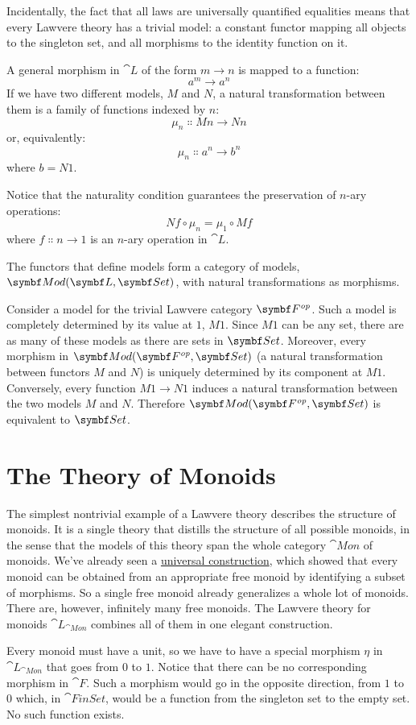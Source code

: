 Incidentally, the fact that all laws are universally quantified
equalities means that every Lawvere theory has a trivial model: a
constant functor mapping all objects to the singleton set, and all morphisms
to the identity function on it.

A general morphism in $\cat{L}$ of the form
$m \to n$ is mapped to a function:
\[a^m \to a^n\]
If we have two different models, $M$ and $N$, a natural
transformation between them is a family of functions indexed by
$n$:
\[\mu_n \Colon M n \to N n\]
or, equivalently:
\[\mu_n \Colon a^n \to b^n\]
where $b = N 1$.

Notice that the naturality condition guarantees the preservation of
$n$-ary operations:
\[N f \circ \mu_n = \mu_1 \circ M f\]
where $f \Colon n \to 1$ is an $n$-ary operation in
$\cat{L}$.

The functors that define models form a category of models,
$\cat{Mod}(\cat{L}, \Set)$, with natural transformations as morphisms.

Consider a model for the trivial Lawvere category
$\Fop$. Such a model is completely determined by
its value at $1$, $M 1$. Since $M 1$ can be any
set, there are as many of these models as there are sets in
$\Set$. Moreover, every morphism in $\cat{Mod}(\Fop, \Set)$ (a
natural transformation between functors $M$ and $N$) is
uniquely determined by its component at $M 1$. Conversely, every
function $M 1 \to N 1$ induces a natural
transformation between the two models $M$ and $N$.
Therefore $\cat{Mod}(\Fop, \Set)$ is equivalent to $\Set$.

\section{The Theory of Monoids}

The simplest nontrivial example of a Lawvere theory describes the
structure of monoids. It is a single theory that distills the structure
of all possible monoids, in the sense that the models of this theory
span the whole category $\cat{Mon}$ of monoids. We've already seen a
\hyperref[free-monoids]{universal
  construction}, which showed that every monoid can be obtained from an
appropriate free monoid by identifying a subset of morphisms. So a
single free monoid already generalizes a whole lot of monoids. There
are, however, infinitely many free monoids. The Lawvere theory for
monoids $\cat{L}_{\cat{Mon}}$ combines all of them in one
elegant construction.

Every monoid must have a unit, so we have to have a special morphism
$\eta$ in $\cat{L}_{\cat{Mon}}$ that goes from $0$ to
$1$. Notice that there can be no corresponding morphism in
$\cat{F}$. Such a morphism would go in the opposite direction, from
$1$ to $0$ which, in $\cat{FinSet}$, would be a function
from the singleton set to the empty set. No such function exists.


